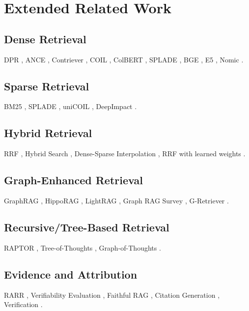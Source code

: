 ﻿%
\chapter{Extended Related Work}
\label{app:related-work}

\section{Dense Retrieval}
DPR \cite{karpukhin2020dpr}, ANCE \cite{xiong2020ance}, Contriever \cite{izacard2022contriever}, COIL \cite{gao2021coil}, ColBERT \cite{khattab2020colbert}, SPLADE \cite{formal2021splade}, BGE \cite{xiao2023bge}, E5 \cite{wang2024e5}, Nomic \cite{nomic2024nomic}.

\section{Sparse Retrieval}
BM25 \cite{robertson2009bm25}, SPLADE \cite{formal2021splade}, uniCOIL \cite{lin2021unicoil}, DeepImpact \cite{ma2021deepimpact}.

\section{Hybrid Retrieval}
RRF \cite{cormack2009rrf}, Hybrid Search \cite{lin2021hybrid}, Dense-Sparse Interpolation \cite{lin2022dense}, RRF with learned weights \cite{zhuang2022learned}.

\section{Graph-Enhanced Retrieval}
GraphRAG \cite{edge2024graphrag}, HippoRAG \cite{gutierrez2024hipporag}, LightRAG \cite{guo2024lightrag}, Graph RAG Survey \cite{peng2024graphrag}, G-Retriever \cite{wang2024gretriever}.

\section{Recursive/Tree-Based Retrieval}
RAPTOR \cite{sarthi2024raptor}, Tree-of-Thoughts \cite{yao2023tot}, Graph-of-Thoughts \cite{besta2023got}.

\section{Evidence and Attribution}
RARR \cite{gao2023rarr}, Verifiability Evaluation \cite{liu2024verifiability}, Faithful RAG \cite{chen2024faithful}, Citation Generation \cite{menick2023citation}, Verification \cite{welleck2022verification}.

